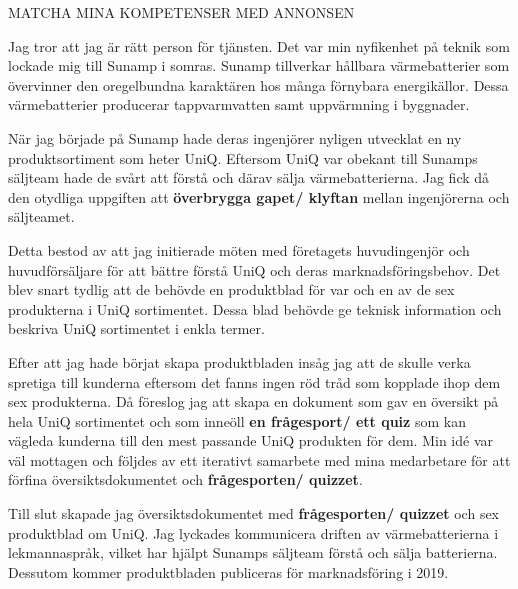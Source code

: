\documentclass[11pt,a4paper,sans]{moderncv}        %
\begin{document}



MATCHA MINA KOMPETENSER MED ANNONSEN

Jag tror att jag {\"a}r r{\"a}tt person f{\"o}r tj{\"a}nsten.
Det var min nyfikenhet p{\aa} teknik som lockade mig till Sunamp i somras.
Sunamp tillverkar h{\aa}llbara v{\"a}rmebatterier som {\"o}vervinner den oregelbundna karakt{\"a}ren hos m{\aa}nga f{\"o}rnybara energik{\"a}llor.
Dessa v{\"a}rmebatterier producerar tappvarmvatten samt uppv{\"a}rmning i byggnader.

N{\"a}r jag b{\"o}rjade p{\aa} Sunamp hade deras ingenj{\"o}rer nyligen utvecklat en ny produktsortiment som heter UniQ.
Eftersom UniQ var obekant till Sunamps s{\"a}ljteam hade de sv{\aa}rt att f{\"o}rst{\aa} och d{\"a}rav s{\"a}lja v{\"a}rmebatterierna.
Jag fick d{\aa} den otydliga uppgiften att \textbf{{\"o}verbrygga gapet/ klyftan} mellan ingenj{\"o}rerna och s{\"a}ljteamet.

Detta bestod av att jag initierade m{\"o}ten med f{\"o}retagets huvudingenj{\"o}r och huvudf{\"o}rs{\"a}ljare f{\"o}r att b{\"a}ttre f{\"o}rst{\aa} UniQ och deras marknadsf{\"o}ringsbehov.
Det blev snart tydlig att de beh{\"o}vde en produktblad f{\"o}r var och en av de sex produkterna i UniQ sortimentet.
Dessa blad beh{\"o}vde ge teknisk information och beskriva UniQ sortimentet i enkla termer.

Efter att jag hade b{\"o}rjat skapa produktbladen ins{\aa}g jag att de skulle verka spretiga till kunderna eftersom det fanns ingen r{\"o}d tr{\aa}d som kopplade ihop dem sex produkterna.
D{\aa} f{\"o}reslog jag att skapa en dokument som gav en {\"o}versikt p{\aa} hela UniQ sortimentet och som inne{\"o}ll \textbf{en fr{\aa}gesport/ ett quiz} som kan v{\"a}gleda kunderna till den mest passande UniQ produkten f{\"o}r dem.
Min id{\'e} var v{\"a}l mottagen och f{\"o}ljdes av ett iterativt samarbete med mina medarbetare f{\"o}r att f{\"o}rfina {\"o}versiktsdokumentet och \textbf{fr{\aa}gesporten/ quizzet}.

Till slut skapade jag {\"o}versiktsdokumentet med \textbf{fr{\aa}gesporten/ quizzet} och sex produktblad om UniQ.
Jag lyckades kommunicera driften av v{\"a}rmebatterierna i lekmannaspr{\aa}k, vilket har hj{\"a}lpt Sunamps s{\"a}ljteam f{\"o}rst{\aa} och s{\"a}lja batterierna.
Dessutom kommer produktbladen publiceras f{\"o}r marknadsf{\"o}ring i 2019.
\end{document}
